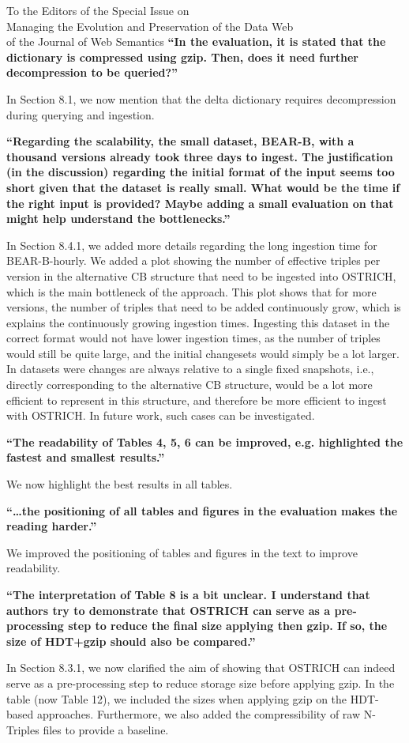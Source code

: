 \documentclass{letter}
\begin{document}
\begin{letter}{To the Editors of the Special Issue on\\Managing the Evolution and Preservation of the Data Web\\of the Journal of Web Semantics}
\textbf{\enquote{In the evaluation, it is stated that the dictionary is compressed using gzip. Then, does it need further decompression to be queried?}}

In Section 8.1, we now mention that the delta dictionary requires decompression during querying and ingestion.

\textbf{\enquote{Regarding the scalability, the small dataset, BEAR-B, with a thousand versions already took three days to ingest. The justification (in the discussion) regarding the initial format of the input seems too short given that the dataset is really small. What would be the time if the right input is provided? Maybe adding a small evaluation on that might help understand the bottlenecks.}}

In Section 8.4.1, we added more details regarding the long ingestion time for BEAR-B-hourly.
We added a plot showing the number of effective triples per version in the alternative CB structure that need to be ingested into OSTRICH,
which is the main bottleneck of the approach.
This plot shows that for more versions, the number of triples that need to be added continuously grow,
which is explains the continuously growing ingestion times.
Ingesting this dataset in the correct format would not have lower ingestion times,
as the number of triples would still be quite large, and the initial changesets would simply be a lot larger.
In datasets were changes are always relative to a single fixed snapshots, i.e., directly corresponding to the alternative CB structure,
would be a lot more efficient to represent in this structure, and therefore be more efficient to ingest with OSTRICH.
In future work, such cases can be investigated.

\textbf{\enquote{The readability of Tables 4, 5, 6 can be improved, e.g. highlighted the fastest and smallest results.}}

We now highlight the best results in all tables.

\textbf{\enquote{\ldots the positioning of all tables and figures in the evaluation makes the reading harder.}}

We improved the positioning of tables and figures in the text to improve readability.

\textbf{\enquote{The interpretation of Table 8 is a bit unclear. I understand that authors try to demonstrate that OSTRICH can serve as a pre-processing step to reduce the final size applying then gzip. If so, the size of HDT+gzip should also be compared.}}

In Section 8.3.1, we now clarified the aim of showing that OSTRICH can indeed serve as a pre-processing step to reduce storage size before applying gzip.
In the table (now Table 12), we included the sizes when applying gzip on the HDT-based approaches.
Furthermore, we also added the compressibility of raw N-Triples files to provide a baseline.

\end{letter}
\end{document}
